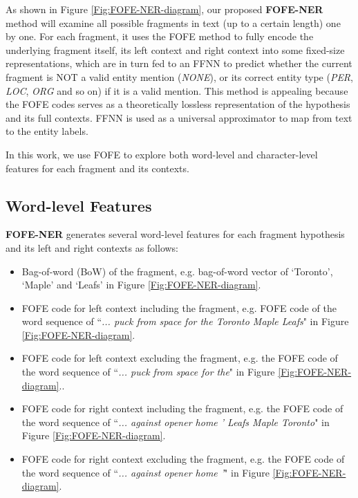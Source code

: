 \documentclass[11pt,a4paper]{article}
\begin{document}
As shown in Figure \ref{Fig:FOFE-NER-diagram}, our proposed \textbf{FOFE-NER} method will examine all possible fragments in text (up to a certain length) one by one. For each fragment, it uses the FOFE method to fully encode the underlying fragment itself, its left context and right context into some fixed-size representations, which are in turn fed to an FFNN to predict whether the current fragment is NOT a valid entity mention ({\it NONE}), or its correct entity type ({\it PER}, {\it LOC}, {\it ORG} and so on) if it is a valid mention. This method is appealing because the FOFE codes serves as a theoretically lossless representation of the hypothesis and its full contexts. FFNN is used as a universal approximator to map from text to the entity labels. 


In this work, we use FOFE to explore both word-level and character-level features for each fragment and its contexts. 

\subsection{Word-level Features}

\textbf{FOFE-NER} generates several word-level features for each fragment hypothesis and its left and right contexts as follows:

\begin{itemize}
	\item Bag-of-word (BoW) of the fragment, e.g. bag-of-word vector of `Toronto', `Maple' and `Leafs' in Figure \ref{Fig:FOFE-NER-diagram}. 
	\item FOFE code for left context including the fragment, e.g. FOFE code of the word sequence of ``{\it ... puck from space for the Toronto Maple Leafs}" in Figure \ref{Fig:FOFE-NER-diagram}.
	\item FOFE code for left context excluding the fragment, e.g. the FOFE code of the word sequence of ``{\it ... puck from space for the}" in Figure \ref{Fig:FOFE-NER-diagram}..	
	\item FOFE code for right context including the fragment, e.g. the FOFE code of the word sequence of ``{\it   ... against opener home ' Leafs  Maple  Toronto}" in Figure \ref{Fig:FOFE-NER-diagram}.
	\item FOFE code for right context excluding the fragment, e.g. the FOFE code of the word sequence of ``{\it ... against opener home '}" in Figure \ref{Fig:FOFE-NER-diagram}.
\end{itemize}
\end{document}
